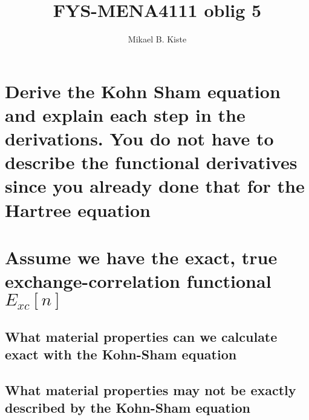 \documentclass{article}
\author{Mikael B. Kiste}
\title{FYS-MENA4111 oblig 5}
\begin{document}
	\maketitle
	\tableofcontents
	\newpage
	\section{Derive the Kohn Sham equation and explain each step in the derivations. You do not have to describe the functional derivatives since you already done that for the Hartree equation}
	
	\section{Assume we have the exact, true exchange-correlation functional $E_{xc}[n]$}
	\subsection{What material properties can we calculate exact with the Kohn-Sham equation}
	\subsection{What material properties may not be exactly described by the Kohn-Sham equation}
\end{document}
